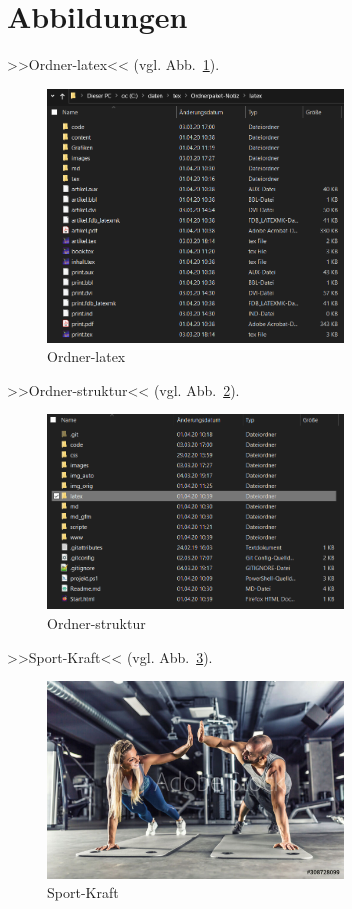 \section{Abbildungen}\label{abbildungen} 

>>Ordner-latex<< (vgl. Abb.~\ref{fig:Ordner-latex}).%
\begin{figure}[H]%
  \centering
  \includegraphics[width=0.7\textwidth]{images/Ordner-latex}
  \caption{Ordner-latex}%
  \label{fig:Ordner-latex}%
\end{figure}
  

>>Ordner-struktur<< (vgl. Abb.~\ref{fig:Ordner-struktur}).%
\begin{figure}[H]%
  \centering
  \includegraphics[width=0.7\textwidth]{images/Ordner-struktur}
  \caption{Ordner-struktur}%
  \label{fig:Ordner-struktur}%
\end{figure}
  

>>Sport-Kraft<< (vgl. Abb.~\ref{fig:Sport-Kraft}).%
\begin{figure}[H]%
  \centering
  \includegraphics[width=0.7\textwidth]{images/Sport-Kraft}
  \caption{Sport-Kraft}%
  \label{fig:Sport-Kraft}%
\end{figure}
  

